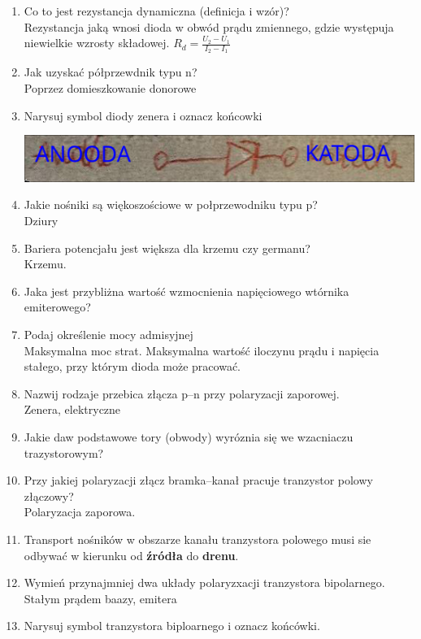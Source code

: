 \documentclass[11pt]{article}
\begin{document}
\begin{enumerate}
\begin{center}
\end{center}
\item Co to jest rezystancja dynamiczna (definicja i wzór)?\\\empty
Rezystancja jaką wnosi dioda w obwód prądu zmiennego, gdzie występuja niewielkie wzrosty składowej. \(R_d=\frac{U_2-U_1}{I_2-I_1}\)
\item Jak uzyskać półprzewdnik typu n?\\\empty
Poprzez domieszkowanie donorowe
\item Narysuj symbol diody zenera i oznacz końcowki\\\empty
\begin{center}
\includegraphics[width=.9\linewidth]{diodazenera.png}
\end{center}
\item Jakie nośniki są więkoszościowe w połprzewodniku typu p?\\\empty
Dziury
\item Bariera potencjału jest większa dla krzemu czy germanu?\\\empty
Krzemu.
\item Jaka jest przybliżna wartość wzmocnienia napięciowego wtórnika emiterowego?
\item Podaj określenie mocy admisyjnej\\\empty
Maksymalna moc strat. Maksymalna wartość iloczynu prądu i napięcia stałego, przy którym dioda może pracować.
\item Nazwij rodzaje przebica złącza p--n przy polaryzacji zaporowej.\\\empty
Zenera, elektryczne
\item Jakie daw podstawowe tory (obwody) wyróznia się we wzacniaczu trazystorowym?
\item Przy jakiej polaryzacji złącz bramka--kanał pracuje tranzystor polowy złączowy?\\\empty
Polaryzacja zaporowa.
\item Transport nośników w obszarze kanału tranzystora polowego musi sie odbywać w kierunku od \textbf{źródła} do \textbf{drenu}.
\item Wymień przynajmniej dwa układy polaryzxacji tranzystora bipolarnego.\\\empty
Stałym prądem baazy, emitera
\item Narysuj symbol tranzystora biploarnego i oznacz końcówki.\\\empty

\end{enumerate}
\end{document}
